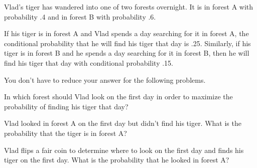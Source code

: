 \documentclass[12pt,twoside]{article}
\begin{document}
\newpage
\begin{problem}{15}
Vlad's tiger has wandered into one of two forests overnight.  It is in forest A with probability .4 and in forest B with probability .6.  

If his tiger is in forest A and Vlad spends a day searching for it in forest A, the conditional probability that he will find his tiger that day is .25.  Similarly, if his tiger is in forest B and he spends a day searching for it in forest B, then he will find his tiger that day with conditional probability .15.

You don't have to reduce your answer for the following problems.

\bparts
{}  In which forest should Vlad look on the first day in order to maximize the probability of finding his tiger that day?
\vspace{3in}

\newpage
{}  Vlad looked in forest A on the first day but didn't find his tiger.  What is the probability that the tiger is in forest A?

\newpage
{}  Vlad flips a fair coin to determine where to look on the first day and finds his tiger on the first day.  What is the probability that he looked in forest A?
\vspace{3.5in}

\eparts
\end{problem}

\newpage
\end{document}
